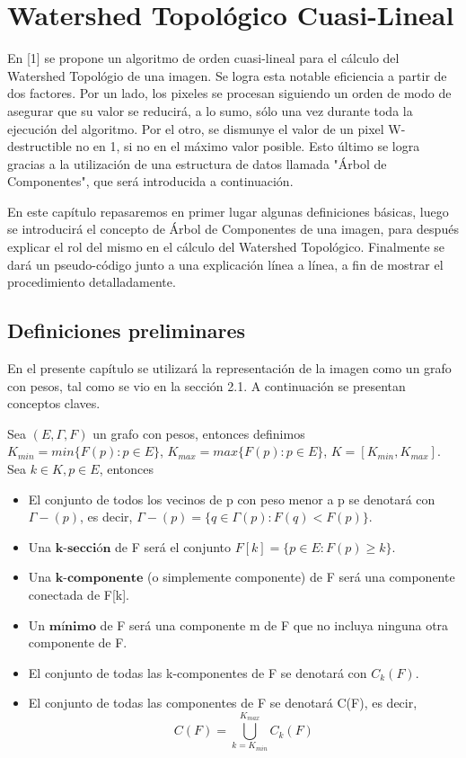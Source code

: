 \chapter{Watershed Topológico Cuasi-Lineal}

En [1] se propone  un algoritmo  de orden cuasi-lineal para el cálculo del Watershed Topológio de una imagen. Se logra esta notable eficiencia a partir de dos factores. Por un lado, los pixeles se procesan siguiendo un orden de modo de asegurar que su valor se reducirá, a lo sumo, sólo una vez durante toda la ejecución del algoritmo. Por el otro, se dismunye el valor de un pixel W-destructible no en 1, si no en el máximo valor posible. Esto último se logra gracias a la utilización de una estructura de datos llamada "Árbol de Componentes", que será introducida a continuación.

En este capítulo repasaremos en primer lugar algunas definiciones básicas, luego se introducirá el concepto de Árbol de Componentes de una imagen, para después explicar el rol del mismo en el cálculo del Watershed Topológico. Finalmente se dará un pseudo-código junto a una explicación línea a línea, a fin de mostrar el procedimiento detalladamente.

\section{Definiciones preliminares}

En el presente capítulo se utilizará la representación de la imagen como un grafo con pesos, tal como se vio en la sección 2.1. A continuación se presentan conceptos claves.

Sea $(E,\Gamma,F)$ un grafo con pesos, entonces definimos $K_{min} = min\{F(p) : p \in E\}$, $K_{max} = max\{F(p) : p \in E \}$, $K = [K_{min},K_{max}]$. Sea $k \in K, p \in E$, entonces

\begin{itemize}
  \item El conjunto de todos los vecinos de p con peso menor a p se denotará con $\Gamma-(p)$, es decir, $\Gamma-(p) = \{ q \in \Gamma(p) : F(q) < F(p) \}$.
  \item Una $\textbf{k-sección}$ de F será el conjunto $F[k] = \{ p \in E : F(p) \ge k \}$.
  \item Una $\textbf{k-componente}$ (o simplemente componente) de F será una componente conectada de F[k].
  \item Un $\textbf{mínimo}$ de F será una componente m de F que no incluya ninguna otra componente de F.
  \item El conjunto de todas las k-componentes de F se denotará con $C_k(F)$.
  \item El conjunto de todas las componentes de F se denotará C(F), es decir, \[ C(F) = \bigcup_{k=K_{min}}^{K_{max}}{C_k(F)} \]
\end{itemize}

